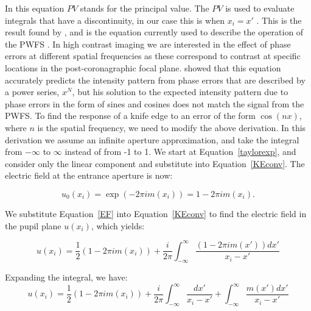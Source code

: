 
In this equation $PV$ stands for the principal value. The $PV$ is used to evaluate integrals that have a discontinuity, in our case this is when $x_i=x'$ \citep{johansson1999hilbert}. This is the result found by \cite{linfoot1948theory}, and is the equation currently used to describe the operation of the PWFS  \citep{verinaud2004nature}. In high contrast imaging we are interested in the effect of phase errors at different spatial frequencies as these correspond to contrast at specific locations in the post-coronagraphic focal plane. \cite{katzoff1971quantitative} showed that this equation accurately predicts the intensity pattern from phase errors that are described by a power series, $x^{N}$, but his solution to the expected intensity pattern due to phase errors in the form of sines and cosines does not match the signal from the PWFS. To find the response of a knife edge to an error of the form $\cos(nx)$, where $n$ is the spatial frequency, we need to modify the above derivation. In this derivation we assume an infinite aperture approximation, and take the integral from $-\infty$ to $\infty$ instead of from -1 to 1. We start at Equation~\ref{taylorexp}, and consider only the linear component and substitute into Equation~\ref{KEconv}.  The electric field at the entrance aperture is now: 


\begin{equation}
    u_0(x_i )=\exp(-2\pi i m(x_i ))=1-2\pi i m(x_i).
    \label{EF}
\end{equation}

We substitute Equation~\ref{EF} into Equation~\ref{KEconv} to find the electric field in the pupil plane $u(x_i)$, which yields:

\begin{equation}
    u(x_i)= \frac{1}{2}(1-2\pi i m(x_i))+\frac{i}{2\pi}\int_{-\infty}^\infty \frac{(1-2\pi i m(x'))dx'}{x_i-x'}
    \label{HT}
\end{equation}

Expanding the integral, we have:
\begin{equation}
    u(x_i)= \frac{1}{2}(1-2\pi i m(x_i))+\frac{i}{2\pi}\int_{-\infty}^\infty \frac{dx'}{x_i-x'}+\int_{-\infty}^\infty \frac{ m(x')dx'}{x_i-x'}
\end{equation}

